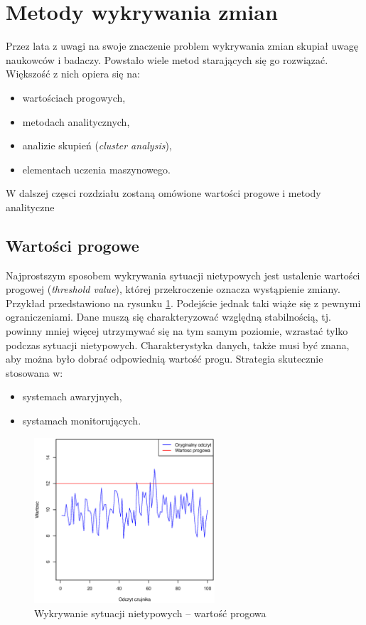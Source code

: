 
\section{Metody wykrywania zmian}

Przez lata z uwagi na swoje znaczenie problem wykrywania zmian skupiał uwagę naukowców i badaczy.
Powstało wiele metod starających się go rozwiązać.
Większość z nich opiera się na:
\begin{itemize}
  \item wartościach progowych,
  \item metodach analitycznych,
  \item analizie skupień (\textit{cluster analysis}),
  \item elementach uczenia maszynowego.
\end{itemize}
W dalszej częsci rozdziału zostaną omówione wartości progowe i metody analityczne
\subsection{Wartości progowe}
Najprostszym sposobem wykrywania sytuacji nietypowych jest ustalenie wartości progowej (\textit{threshold value}),
której przekroczenie oznacza wystąpienie zmiany.
Przykład przedstawiono na rysunku \ref{fig:SignalThreshold}.
Podejście jednak taki wiąże się z pewnymi ograniczeniami.
Dane muszą się charakteryzować względną stabilnością,
tj. powinny mniej więcej utrzymywać się na tym samym poziomie, wzrastać tylko podczas sytuacji nietypowych.
Charakterystyka danych,
także musi być znana,
aby można było dobrać odpowiednią wartość progu.
Strategia skutecznie stosowana w:
\begin{itemize}
  \item systemach awaryjnych,
  \item systamach monitorujących.
\end{itemize}
\begin{figure}[htbp]
\centering
	\includegraphics[width=0.6\textwidth]{img/ch-2-threshold}
	\caption{Wykrywanie sytuacji nietypowych -- wartość progowa}
  \label{fig:SignalThreshold}
\end{figure}

